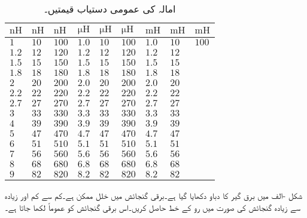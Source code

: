 \begin{table}\caption{امالہ کی عمومی دستیاب قیمتیں۔}
\centering
\begin{tabular}{lllllllll}
$\si{\nano\henry}$ & $\si{\nano\henry}$ &$\si{\nano\henry}$ &$\si{\micro\henry}$ &$\si{\micro\henry}$ &$\si{\micro\henry}$ &$\si{\milli\henry}$ &$\si{\milli\henry}$ &$\si{\milli\henry}$ \\
\hline
$1$ & $10$ &$100$ & $1.0$ & $10$ &$100$ & $1.0$ & $10$ & $100$ \\
$1.2$ & $12$ &$120$ & $1.2$ & $12$ &$120$ & $1.2$ & $12$ &  \\
$1.5$ & $15$ &$150$ & $1.5$ & $15$ &$150$ & $1.5$ & $15$ &  \\
$1.8$ & $18$ &$180$ & $1.8$ & $18$ &$180$ & $1.8$ & $18$ &  \\
$2$ & $20$ &$200$ & $2.0$ & $20$ &$200$ & $2.0$ & $20$ &  \\
$2.2$ & $22$ &$220$ & $2.2$ & $22$ &$220$ & $2.2$ & $22$ &  \\
$2.7$ & $27$ &$270$ & $2.7$ & $27$ &$270$ & $2.7$ & $27$ &  \\
$3$ & $33$ &$330$ & $3.3$ & $33$ &$330$ & $3.3$ & $33$ &  \\
$4$ & $39$ &$390$ & $3.9$ & $39$ &$390$ & $3.9$ & $39$ &  \\
$5$ & $47$ &$470$ & $4.7$ & $47$ &$470$ & $4.7$ & $47$ &  \\
$6$ & $51$ &$510$ & $5.1$ & $51$ &$510$ & $5.1$ & $51$ &  \\
$7$ & $56$ &$560$ & $5.6$ & $56$ &$560$ & $5.6$ & $56$ &  \\
$8$ & $68$ &$680$ & $6.8$ & $68$ &$680$ & $6.8$ & $68$ &  \\
$9$ & $82$ &$820$ & $8.2$ & $82$ &$820$ & $8.2$ & $82$ &  
\end{tabular}
\label{جدول_امالہ_امالہ_عمومی_دستیاب_قیمتیں}
\end{table}

شکل -الف میں  برق گیر کا دباو دکھایا گیا ہے۔برقی گنجائش میں خلل  ممکن ہے۔کم سے کم اور زیادہ سے زیادہ گنجائش کی صورت میں رو کے خط حاصل کریں۔اس برقی گنجائش کو عموماً  لکھا جاتا ہے۔

